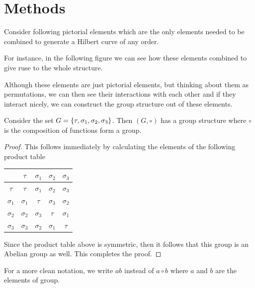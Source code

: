 \documentclass[12pt]{article}
\begin{document}
\section*{Methods}
Consider following pictorial elements which are the only elements needed to be combined to generate a Hilbert curve of any order.

For instance, in the following figure we can see how these elements combined to give ruse to the whole structure.

Although these elements are just pictorial elements, but thinking about them as permutations, we can then see their interactions with each other and if they interact nicely, we can construct the group structure out of these elements. 


\begin{theorem}
	\label{thm:GIsGroup}
	Consider the set $ G = \{\tau, \sigma_1, \sigma_2, \sigma_3\} $. Then $ (G,\circ) $ has a group structure where $ \circ $ is the composition of functions form a group.
\end{theorem}
\begin{proof}
	This follows immediately by calculating the elements of the following product table
	\begin{center}
			\begin{tabular}{c|cccc}
			& $\tau$ & $\sigma_1$ & $\sigma_2$ & $\sigma_3$ \\
			\hline
			$\tau$ & $\tau$ & $\sigma_1$ & $\sigma_2$ & $\sigma_3$ \\
			$\sigma_1$ & $\sigma_1$ & $\tau$ & $\sigma_3$ & $\sigma_2$ \\
			$\sigma_2$ & $\sigma_2$ & $\sigma_3$ & $\tau$ & $\sigma_1$ \\
			$\sigma_3$ & $\sigma_3$ & $\sigma_2$ & $\sigma_1$ & $\tau$ \\
		\end{tabular}
	\end{center}
	Since the product table above is symmetric, then it follows that this group is an Abelian group as well. This completes the proof.
\end{proof}



\begin{remark}
	For a more clean notation, we write $ ab $ instead of $ a\circ b $ where $ a $ and $ b $ are the elements of group.
\end{remark}
\end{document}
